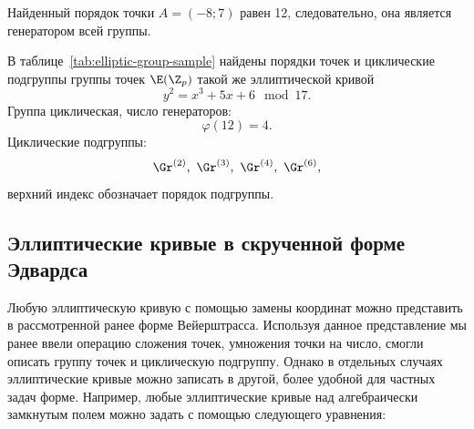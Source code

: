 Найденный порядок точки $A = (-8; 7)$ равен 12, следовательно, она является генератором всей группы.

В таблице~\ref{tab:elliptic-group-sample} найдены порядки точек и циклические подгруппы группы точек $\E(\Z_p)$ такой же эллиптической кривой
    \[ y^2 = x^3 + 5 x + 6 \mod 17. \]
Группа циклическая, число генераторов:
    \[ \varphi(12) = 4. \]
Циклические подгруппы:
    \[ \Gr^{(2)}, ~ \Gr^{(3)}, ~ \Gr^{(4)}, ~ \Gr^{(6)}, \]
верхний индекс обозначает порядок подгруппы.

\begin{table}[!ht]
    \centering
    \caption{Генераторы и циклические подгруппы группы точек эллиптической кривой\label{tab:elliptic-group-sample}}
\end{table}

\subsection{Эллиптические кривые в скрученной форме Эдвардса}

Любую эллиптическую кривую с помощью замены координат можно представить в рассмотренной ранее форме Вейерштрасса. Используя данное представление мы ранее ввели операцию сложения точек, умножения точки на число, смогли описать группу точек и циклическую подгруппу. Однако в отдельных случаях эллиптические кривые можно записать в другой, более удобной для частных задач форме. Например, любые эллиптические кривые над алгебраически замкнутым полем можно задать с помощью следующего уравнения:

